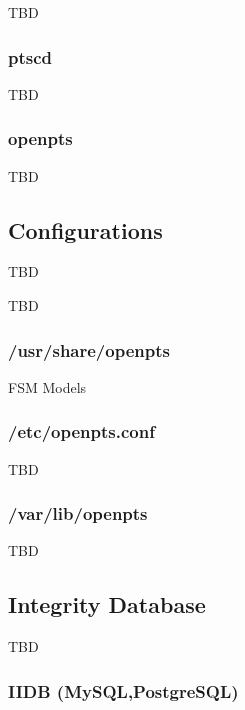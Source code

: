 \documentclass[12pt,a4paper]{article}
\begin{document}
TBD


\subsubsection{ptscd}

TBD

\subsubsection{openpts}

TBD

\subsection{Configurations}

TBD

TBD

\subsubsection{/usr/share/openpts}

FSM Models

\subsubsection{/etc/openpts.conf}

TBD
 
\subsubsection{/var/lib/openpts}

TBD

\subsection{Integrity Database}

TBD

\subsubsection{IIDB (MySQL,PostgreSQL)}
\end{document}
